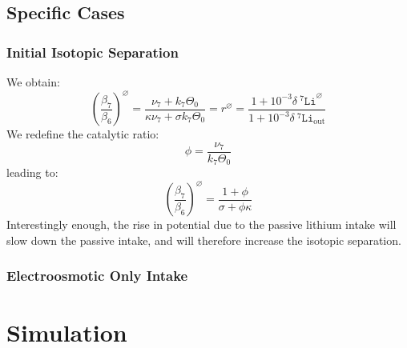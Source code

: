 \documentclass[aps,onecolumn,11pt]{revtex4}
\newcommand{\mychem}[1]{\mathtt{#1}}
\newcommand{\spLi}[1]{{\!~^{#1}\mychem{Li}}}
\newcommand{\deltaLi}{\delta\!\!\spLi{7}}
\newcommand{\myout}[1]{{#1}_{\mathrm{out}}}
\newcommand{\deltaLiOut}{\myout{\deltaLi}}
\begin{document}
\subsection{Specific Cases}
\subsubsection{Initial Isotopic Separation}
We obtain:
\begin{equation}
	\left(\dfrac{\beta_7}{\beta_6}\right)^\varnothing = \dfrac{\nu_7+k_7\Theta_0}{\kappa \nu_7+\sigma k_7 \Theta_0} 
	= r^\varnothing = \dfrac{1+10^{-3} \deltaLi^\varnothing}{1+10^{-3}\deltaLiOut}
\end{equation}
We redefine the catalytic ratio:
\begin{equation}
	\phi = \dfrac{\nu_7}{k_7\Theta_0}
\end{equation}
leading to:
\begin{equation}
	\left(\dfrac{\beta_7}{\beta_6}\right)^\varnothing = \dfrac{1+\phi}{\sigma+\phi\kappa}
\end{equation}
Interestingly enough, the rise in potential due to the passive lithium intake will slow down the passive intake, and will therefore increase the isotopic separation.
\subsubsection{Electroosmotic Only Intake}

\section{Simulation}
\end{document}
